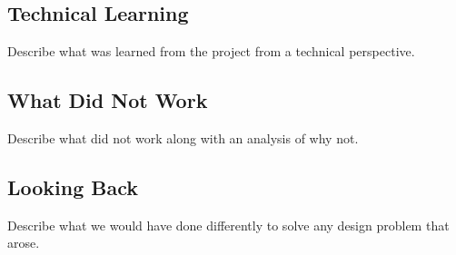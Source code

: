 \subsection{Technical Learning}
Describe what was learned from the project from a technical perspective.

\subsection{What Did Not Work}
Describe what did not work along with an analysis of why not.

\subsection{Looking Back}
Describe what we would have done differently to solve any design problem that arose.

